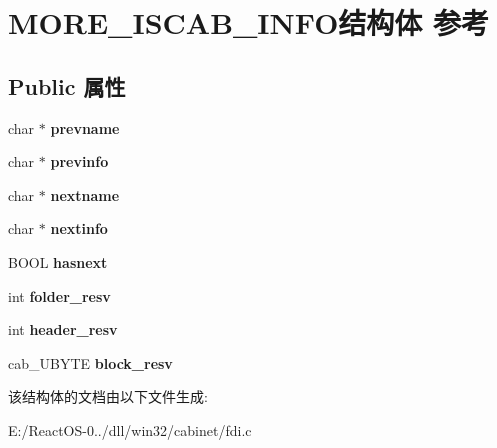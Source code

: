 \hypertarget{struct_m_o_r_e___i_s_c_a_b___i_n_f_o}{}\section{M\+O\+R\+E\+\_\+\+I\+S\+C\+A\+B\+\_\+\+I\+N\+F\+O结构体 参考}
\label{struct_m_o_r_e___i_s_c_a_b___i_n_f_o}
\subsection*{Public 属性}
\begin{DoxyCompactItemize}
\item 
\mbox{\label{struct_m_o_r_e___i_s_c_a_b___i_n_f_o_a1528949f19f94ffe93c638a1abc6f5e5}} 
char $\ast$ {\bfseries prevname}
\item 
\mbox{\label{struct_m_o_r_e___i_s_c_a_b___i_n_f_o_afb543881b0a848363a37222e413d5d36}} 
char $\ast$ {\bfseries previnfo}
\item 
\mbox{\label{struct_m_o_r_e___i_s_c_a_b___i_n_f_o_aed073880dd7ca5f5cf948620a116535c}} 
char $\ast$ {\bfseries nextname}
\item 
\mbox{\label{struct_m_o_r_e___i_s_c_a_b___i_n_f_o_a561b8839e6eea0a94f2ce432f738017e}} 
char $\ast$ {\bfseries nextinfo}
\item 
\mbox{\label{struct_m_o_r_e___i_s_c_a_b___i_n_f_o_a2956144e3beff1f8f684e61272886f80}} 
B\+O\+OL {\bfseries hasnext}
\item 
\mbox{\label{struct_m_o_r_e___i_s_c_a_b___i_n_f_o_a63c925476991b6d7501fd093a2821626}} 
int {\bfseries folder\+\_\+resv}
\item 
\mbox{\label{struct_m_o_r_e___i_s_c_a_b___i_n_f_o_aed40db1f95a23e6e1ccee038e4d92ed4}} 
int {\bfseries header\+\_\+resv}
\item 
\mbox{\label{struct_m_o_r_e___i_s_c_a_b___i_n_f_o_a050d818eec4e08650a81eba6c59cf6da}} 
cab\+\_\+\+U\+B\+Y\+TE {\bfseries block\+\_\+resv}
\end{DoxyCompactItemize}


该结构体的文档由以下文件生成\+:\begin{DoxyCompactItemize}
\item 
E\+:/\+React\+O\+S-\/0../dll/win32/cabinet/fdi.\+c\end{DoxyCompactItemize}
